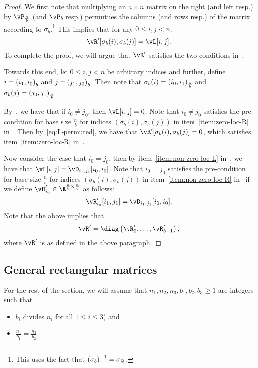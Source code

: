 \begin{proof}
We first note that multiplying an $n\times n$ matrix on the right (and left resp.) by $\vP_{\frac nb}$ (and $\vP_b$ resp.) permutues the columns (and rows resp.) of the matrix according to $\sigma_b$.\footnote{This uses the fact that $\left( {\sigma_b}\right)^{-1}=\sigma_{\frac nb}$.} This implies that for any $0\le i,j<n$:
\begin{equation}
\label{eq:L-permuted}
\vR'[\sigma_b(i),\sigma_b(j)]=\vL[i,j].
\end{equation}
To complete the proof, we will argue that $\vR'$ satisfies the two conditions in~.

Towards this end, let $0\le i,j<n$ be arbitrary indices and further, define $i=\left( {{i_1},{i_0}}\right)_{{b}}$ and $j=\left( {{j_1},{j_0}}\right)_{{b}}$. Then note that $\sigma_b(i)=\left( {{i_0},{i_1}}\right)_{{\frac nb}}$ and $\sigma_b(j)=\left( {{j_0},{j_1}}\right)_{{\frac nb}}$.

By~, we have that if $i_0\ne j_0$, then $\vL[i,j]=0$. Note that $i_0\ne j_0$ satisfies the pre-condition for base size $\frac nb$ for indices $(\sigma_b(i),\sigma_b(j))$ in item~\ref{item:zero-loc-R} in~.  Then   by~\cref{eq:L-permuted}, we have that $\vR'[\sigma_b(i),\sigma_b(j)]=0$, which satisfies item~\ref{item:zero-loc-R} in~.

Now consider the case that $i_0=j_0$, then by item~\ref{item:non-zero-loc-L} in~, we have that $\vL[i,j]=\vD_{i_1,j_1}[i_0,i_0]$.  Note that $i_0= j_0$ satisfies the pre-condition for base size $\frac nb$ for indices $(\sigma_b(i),\sigma_b(j))$ in item~\ref{item:non-zero-loc-R} in~ if we define $\vR'_{i_0}\in\R^{\frac nb\times\frac nb}$ as follows:
\[\vR'_{i_0}[i_1,j_1]=\vD_{i_1,j_1}[i_0,i_0].\] 
Note that the above implies that 
\[\vR'=\diag\parens{\vR'_0,\dots,\vR'_{b-1}},\]
where $\vR'_{\cdot}$ is as defined in the above paragraph.
\end{proof}



\subsection{General rectangular matrices}
For the rest of the section, we will assume that $n_1, n_2, n_3, b_1, b_2 , b_3 \ge 1$ are integers such that 
\begin{itemize}
\item $b_i$ divides $n_i$ for all $1\le i\le 3$) and 
\item $\frac{n_1}{b_1} = \frac{n_2}{b_2}$
\end{itemize}

